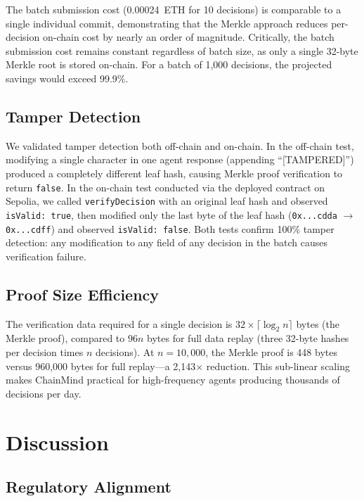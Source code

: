 \documentclass[manuscript,nonacm]{acmart}
\begin{document}
The batch submission cost (0.00024~ETH for 10 decisions) is comparable to a single individual commit, demonstrating that the Merkle approach reduces per-decision on-chain cost by nearly an order of magnitude. Critically, the batch submission cost remains constant regardless of batch size, as only a single 32-byte Merkle root is stored on-chain. For a batch of 1,000 decisions, the projected savings would exceed 99.9\%.

\subsection{Tamper Detection}

We validated tamper detection both off-chain and on-chain. In the off-chain test, modifying a single character in one agent response (appending ``[TAMPERED]'') produced a completely different leaf hash, causing Merkle proof verification to return \texttt{false}. In the on-chain test conducted via the deployed contract on Sepolia, we called \texttt{verifyDecision} with an original leaf hash and observed \texttt{isValid: true}, then modified only the last byte of the leaf hash (\texttt{0x...cdda} $\rightarrow$ \texttt{0x...cdff}) and observed \texttt{isValid: false}. Both tests confirm 100\% tamper detection: any modification to any field of any decision in the batch causes verification failure.

\subsection{Proof Size Efficiency}

The verification data required for a single decision is $32 \times \lceil \log_2 n \rceil$ bytes (the Merkle proof), compared to $96n$ bytes for full data replay (three 32-byte hashes per decision times $n$ decisions). At $n = 10{,}000$, the Merkle proof is 448 bytes versus 960,000 bytes for full replay---a 2,143$\times$ reduction. This sub-linear scaling makes ChainMind practical for high-frequency agents producing thousands of decisions per day.


\section{Discussion}
\label{sec:discussion}

\subsection{Regulatory Alignment}
\end{document}
